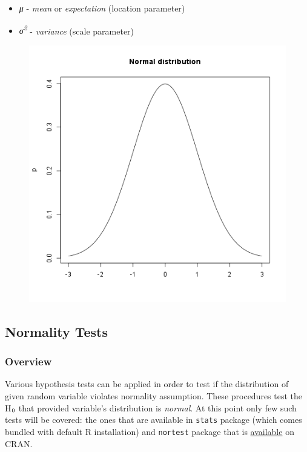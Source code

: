 \documentclass{article}
\makeatletter
\def\maxwidth{\ifdim\Gin@nat@width>\linewidth\linewidth
\else\Gin@nat@width\fi}
\let\Oldincludegraphics\includegraphics
\renewcommand{\includegraphics}[1]{\Oldincludegraphics[width=\maxwidth]{#1}}
\newcommand{\textsubscr}[1]{\ensuremath{_{\scriptsize\textrm{#1}}}}
\makeatother
\begin{document}
\begin{itemize}
\item
  \emph{μ} - \emph{mean} or \emph{expectation} (location parameter)
\item
  \emph{σ\textsuperscript{2}} - \emph{variance} (scale parameter)
\end{itemize}
\begin{figure}[htbp]
\centering
\includegraphics{2f8c434e103f36ec70966b372838d448.png}
\caption{}
\end{figure}

\subsection{Normality Tests}

\subsubsection{Overview}

Various hypothesis tests can be applied in order to test if the
distribution of given random variable violates normality assumption.
These procedures test the H\textsubscr{0} that provided variable's
distribution is \emph{normal}. At this point only few such tests will be
covered: the ones that are available in \texttt{stats} package (which
comes bundled with default R installation) and \texttt{nortest} package
that is
\href{http://cran.r-project.org/web/packages/nortest/index.html}{available}
on CRAN.
\end{document}
